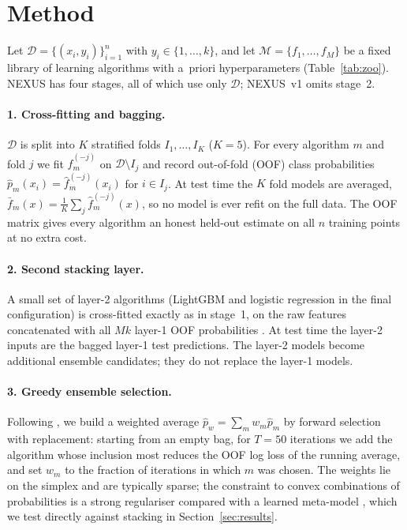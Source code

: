 \section{Method}
\label{sec:method}

Let $\mathcal{D}=\{(x_i,y_i)\}_{i=1}^n$ with $y_i\in\{1,\dots,k\}$, and let
$\mathcal{M}=\{f_1,\dots,f_M\}$ be a fixed library of learning algorithms with
a~priori hyperparameters (Table~\ref{tab:zoo}). NEXUS has four stages, all of
which use only $\mathcal{D}$; NEXUS~v1 omits stage~2.

\paragraph{1. Cross-fitting and bagging.}
$\mathcal{D}$ is split into $K$ stratified folds $I_1,\dots,I_K$ ($K{=}5$). For every
algorithm $m$ and fold $j$ we fit $\hat f_{m}^{(-j)}$ on $\mathcal{D}\setminus I_j$
and record out-of-fold (OOF) class probabilities
$\hat p_m(x_i)=\hat f_m^{(-j)}(x_i)$ for $i\in I_j$. At test time the $K$ fold models
are averaged, $\bar f_m(x)=\frac1K\sum_j \hat f_m^{(-j)}(x)$, so no model is ever
refit on the full data. The OOF matrix gives every algorithm an honest held-out
estimate on all $n$ training points at no extra cost.

\paragraph{2. Second stacking layer.}
A small set of layer-2 algorithms (LightGBM and logistic regression in the
final configuration) is cross-fitted exactly as in stage~1, on the raw features
concatenated with all $M k$ layer-1 OOF probabilities \citep{wolpert1992stacked,erickson2020autogluon}.
At test time the layer-2 inputs are the bagged layer-1 test predictions. The
layer-2 models become additional ensemble candidates; they do not replace the
layer-1 models.

\paragraph{3. Greedy ensemble selection.}
Following \citet{caruana2004ensemble}, we build a weighted average
$\hat p_w=\sum_m w_m \hat p_m$ by forward selection with replacement: starting from
an empty bag, for $T{=}50$ iterations we add the algorithm whose inclusion most
reduces the OOF log loss of the running average, and set $w_m$ to the fraction of
iterations in which $m$ was chosen. The weights lie on the simplex and are
typically sparse; the constraint to convex combinations of probabilities is a
strong regulariser compared with a learned meta-model
\citep{caruana2006getting}, which we test directly against stacking in
Section~\ref{sec:results}.

